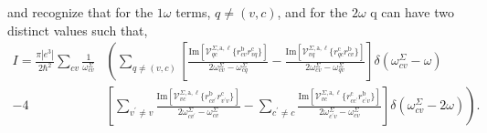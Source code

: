 \documentclass[letterpaper,aps]{revtex4}
\begin{document}
and recognize that for the $1\omega$ terms, $q\neq (v,c)$, and for the 
$2\omega$ q can have two distinct values such that,
\begin{align*}  
I = \frac{\pi|e^3|}{2\hbar^2}\sum_{cv}\frac{1}{\omega^\Sigma_{cv}}
&\left(
\sum_{q\neq (v,c)}
\left[
 \frac{\mathrm{Im}\left[\mathcal{V}^{\Sigma,\text{a},\ell}_{qc}
        \{r^{\text{b}}_{cv}
        r^{\text{c}}_{vq}\}\right]}
        {2\omega^\Sigma_{cv}-\omega^\Sigma_{cq}}
 -\frac{\mathrm{Im}\left[\mathcal{V}^{\Sigma,\text{a},\ell}_{vq}
        \{r^{\text{c}}_{qc}
        r^{\text{b}}_{cv}\}\right]}
        {2\omega^\Sigma_{cv}-\omega^\Sigma_{qv}}
\right]\delta(\omega^{\Sigma}_{cv}-\omega)\right.\nonumber\\
-
4&\left.\left[
 \sum_{v^{\prime}\neq v}
  \frac{\mathrm{Im}\left[\mathcal{V}^{\Sigma,\text{a},\ell}_{vc}
        \{r^{\text{b}}_{cv^{\prime}}
        r^{\text{c}}_{v^{\prime}v}\}\right]}
        {2\omega^\Sigma_{cv^{\prime}}-\omega^\Sigma_{cv}}
 -\sum_{c^{\prime}\neq c}
 \frac{\mathrm{Im}\left[\mathcal{V}^{\Sigma,\text{a},\ell}_{vc}
        \{r^{\text{c}}_{cc^{\prime}}
        r^{\text{b}}_{c^{\prime}v}\}\right]}
        {2\omega^\Sigma_{c^{\prime}v}-\omega^\Sigma_{cv}}
\right]\delta(\omega^{\Sigma}_{cv}-2\omega)\right)
.
\end{align*}
 





\end{document}
